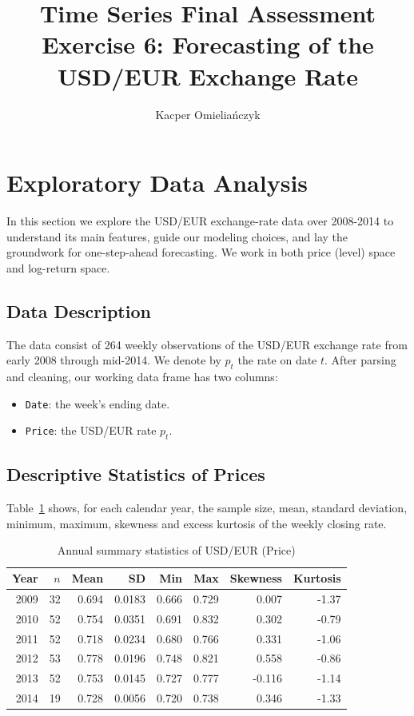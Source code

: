 \documentclass[11pt,a4paper]{article}
\begin{document}
    \title{Time Series Final Assessment \\ Exercise 6: Forecasting of the USD/EUR Exchange Rate}
    \author{Kacper Omieliańczyk}
    \date{}

    \maketitle
    
    \section{Exploratory Data Analysis}
    \label{chap:eda}

    In this section we explore the USD/EUR exchange-rate data over 2008-2014 to understand its main features, guide our modeling choices, and lay the groundwork for one-step-ahead forecasting. We work in both price (level) space and log-return space.

    \subsection{Data Description}
    The data consist of 264 weekly observations of the USD/EUR exchange rate from early 2008 through mid-2014.  We denote by \(p_t\) the rate on date \(t\).  After parsing and cleaning, our working data frame has two columns:
    \begin{itemize}
    \item \texttt{Date}: the week's ending date.
    \item \texttt{Price}: the USD/EUR rate \(p_t\).
    \end{itemize}

    \subsection{Descriptive Statistics of Prices}
    Table~\ref{tab:annual_stats} shows, for each calendar year, the sample size, mean, standard deviation, minimum, maximum, skewness and excess kurtosis of the weekly closing rate.
    \begin{table}[H]
    \centering
    \caption{Annual summary statistics of USD/EUR (Price)}  
    \label{tab:annual_stats}
    \small
    \begin{tabular}{rrrrrrrr}
        \toprule
        Year & \(n\) & Mean & SD & Min & Max & Skewness & Kurtosis \\ 
        \midrule
        2009 &   32 & 0.694 & 0.0183 & 0.666 & 0.729 & 0.007  & -1.37 \\ 
        2010 &   52 & 0.754 & 0.0351 & 0.691 & 0.832 & 0.302  & -0.79 \\ 
        2011 &   52 & 0.718 & 0.0234 & 0.680 & 0.766 & 0.331  & -1.06 \\ 
        2012 &   53 & 0.778 & 0.0196 & 0.748 & 0.821 & 0.558  & -0.86 \\ 
        2013 &   52 & 0.753 & 0.0145 & 0.727 & 0.777 & -0.116 & -1.14 \\ 
        2014 &   19 & 0.728 & 0.0056 & 0.720 & 0.738 & 0.346  & -1.33 \\ 
        \bottomrule
    \end{tabular}
    \end{table}
\end{document}
